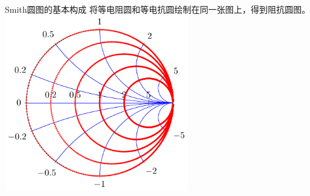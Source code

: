\begin{frame}{Smith圆图的基本构成}
  将等电阻圆和等电抗圆绘制在同一张图上，得到阻抗圆图。
  \centering
  \includegraphics[width=8cm]{Cha4//fig4-5.pdf}
\end{frame}

